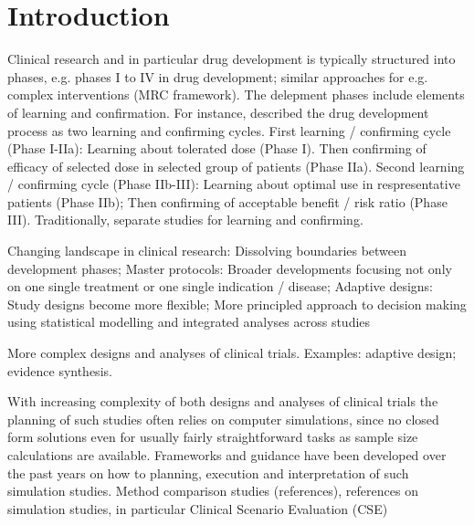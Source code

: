 \documentclass[bimj,fleqn]{w-art}
\theoremstyle{plain}
\theoremstyle{definition}
\begin{document}
\maketitle                   %







\section{Introduction}

Clinical research and in particular drug development is typically structured into phases, e.g. phases I to IV in drug development; similar approaches for e.g. complex interventions (MRC framework). 
The delepment phases include elements of learning and confirmation. 
For instance, \cite{sheiner_learning_1997} described the drug development process as two learning and confirming cycles. 
First learning / confirming cycle (Phase I-IIa): Learning about tolerated dose (Phase I). 
Then confirming of efficacy of selected dose in selected group of patients (Phase IIa). 
Second learning / confirming cycle (Phase IIb-III): Learning about optimal use in respresentative patients (Phase IIb); Then confirming of acceptable benefit / risk ratio (Phase III). 
Traditionally, separate studies for learning and confirming.  

Changing landscape in clinical research: Dissolving boundaries between development phases; Master protocols: Broader developments focusing not only on one single treatment or one single indication / disease; Adaptive designs: Study designs become more flexible; More principled approach to decision making using statistical modelling and integrated analyses across studies

More complex designs and analyses of clinical trials. 
Examples: adaptive design; evidence synthesis.

With increasing complexity of both designs and analyses of  clinical trials the planning of such studies often relies on computer simulations, since no closed form solutions even for usually fairly straightforward tasks as sample size calculations are available. 
Frameworks and guidance have been developed over the past years on how to planning, execution and interpretation of such simulation studies. 
Method comparison studies (references), references on simulation studies, in particular Clinical Scenario Evaluation (CSE) \\
\end{document}
